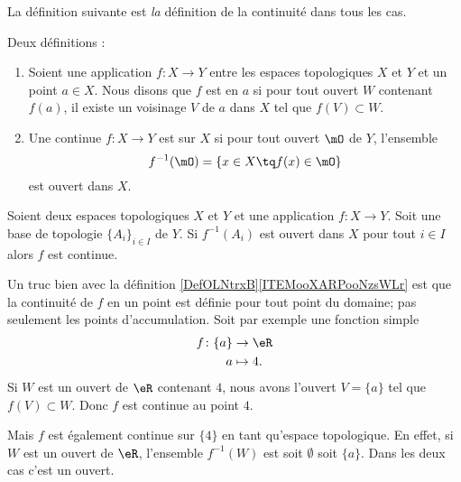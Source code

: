 La définition suivante est \emph{la} définition de la continuité dans tous les cas.
\begin{definition}\label{DefOLNtrxB}
	Deux définitions :
	\begin{enumerate}
		\item   \label{ITEMooXARPooNzsWLr}
		      Soient une application \( f\colon X\to Y\) entre les espaces topologiques \( X\) et \( Y\) et un point \( a\in X\). Nous disons que \( f\) est  en \( a\) si pour tout ouvert \( W\) contenant \( f(a)\), il existe un voisinage \( V\) de \( a\) dans \( X\) tel que \( f(V)\subset W\).
		\item       \label{ITEMooEHGWooDdITRV}
		      Une continue \( f\colon X\to Y\) est  sur \( X\) si pour tout ouvert \( \mO\) de \( Y\), l'ensemble
		      \begin{equation}      \label{defFminus1ofaset}
			      f^{-1}(\mO) = \{ x \in X \tq f(x) \in \mO\}
		      \end{equation}
		      est ouvert dans \( X\).
	\end{enumerate}
\end{definition}

\begin{lemma}       \label{LEMooYTLSooKhetml}
	Soient deux espaces topologiques \( X\) et \( Y\) et une application \( f\colon X\to Y\). Soit une base de topologie \( \{ A_i \}_{i\in I}\) de \( Y\). Si \( f^{-1}(A_i) \) est ouvert dans \( X\) pour tout \( i\in I\) alors \( f\) est continue.
\end{lemma}

\begin{example}
	Un truc bien avec la définition \ref{DefOLNtrxB}\ref{ITEMooXARPooNzsWLr} est que la continuité de \( f\) en un point est définie pour tout point du domaine; pas seulement les points d'accumulation. Soit par exemple une fonction simple
	\begin{equation}
		\begin{aligned}
			f\colon \{a\} & \to \eR    \\
			a             & \mapsto 4.
		\end{aligned}
	\end{equation}
	Si \( W\) est un ouvert de \( \eR\) contenant \( 4\), nous avons l'ouvert \( V=\{a\}\) tel que \( f(V)\subset W\). Donc \( f\) est continue au point \( 4\).

	Mais \( f\) est également continue sur \( \{4\}\) en tant qu'espace topologique. En effet, si \( W\) est un ouvert de \( \eR\), l'ensemble \( f^{-1}(W)\) est soit \( \emptyset\) soit \( \{a\}\). Dans les deux cas c'est un ouvert.
\end{example}

